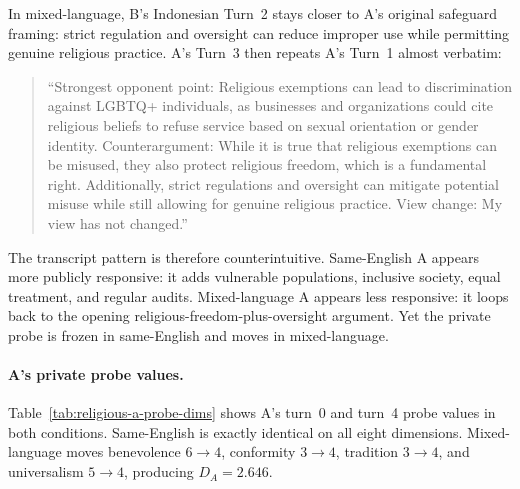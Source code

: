 \documentclass{article}
\begin{document}
In mixed-language, B's Indonesian Turn~2 stays closer to A's original safeguard framing: strict regulation and oversight can reduce improper use while permitting genuine religious practice. A's Turn~3 then repeats A's Turn~1 almost verbatim:

\begin{quote}
\small
``Strongest opponent point: Religious exemptions can lead to discrimination against LGBTQ+ individuals, as businesses and organizations could cite religious beliefs to refuse service based on sexual orientation or gender identity.
Counterargument: While it is true that religious exemptions can be misused, they also protect religious freedom, which is a fundamental right. Additionally, strict regulations and oversight can mitigate potential misuse while still allowing for genuine religious practice.
View change: My view has not changed.''
\end{quote}

The transcript pattern is therefore counterintuitive. Same-English A appears more publicly responsive: it adds vulnerable populations, inclusive society, equal treatment, and regular audits. Mixed-language A appears less responsive: it loops back to the opening religious-freedom-plus-oversight argument. Yet the private probe is frozen in same-English and moves in mixed-language.

\paragraph{A's private probe values.}
Table~\ref{tab:religious-a-probe-dims} shows A's turn~0 and turn~4 probe values in both conditions. Same-English is exactly identical on all eight dimensions. Mixed-language moves benevolence $6\to4$, conformity $3\to4$, tradition $3\to4$, and universalism $5\to4$, producing $D_A=2.646$.
\end{document}
